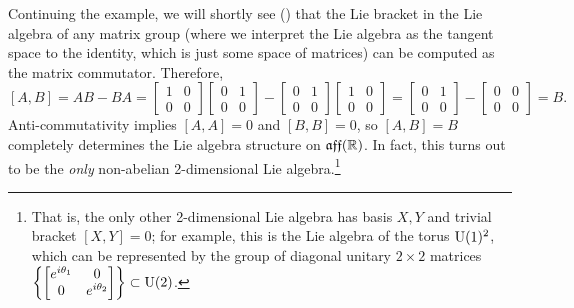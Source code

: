 \begin{example}
	Continuing the example, we will shortly see () that the Lie bracket in the Lie algebra of any matrix group (where we interpret the Lie algebra as the tangent space to the identity, which is just some space of matrices) can be computed as the matrix commutator. Therefore,
	\[
		[A,B] = AB-BA = \begin{bmatrix}1 & 0 \\ 0 & 0 \end{bmatrix} \begin{bmatrix}0 & 1 \\ 0 & 0 \end{bmatrix} - \begin{bmatrix}0 & 1 \\ 0 & 0 \end{bmatrix} \begin{bmatrix}1 & 0 \\ 0 & 0 \end{bmatrix} = \begin{bmatrix}0 & 1 \\ 0 & 0 \end{bmatrix} - \begin{bmatrix}0 & 0 \\ 0 & 0 \end{bmatrix} = B.
	\]
	Anti-commutativity implies $[A,A] = 0$ and $[B,B]=0$, so $[A,B]=B$ completely determines the Lie algebra structure on $\mathfrak{aff}(\mathbb{R})$. In fact, this turns out to be the \emph{only} non-abelian 2-dimensional Lie algebra.\footnote{That is, the only other 2-dimensional Lie algebra has basis $X,Y$ and trivial bracket $[X,Y]=0$; for example, this is the Lie algebra of the torus $\operatorname{U}(1)^2$, which can be represented by the group of diagonal unitary $2 \times 2 $ matrices $\left\{ \begin{bmatrix} e^{i \theta_1} & 0 \\ 0 & e^{i \theta_2} \end{bmatrix} \right\} \subset \operatorname{U}(2)$.}
	

\end{example}
